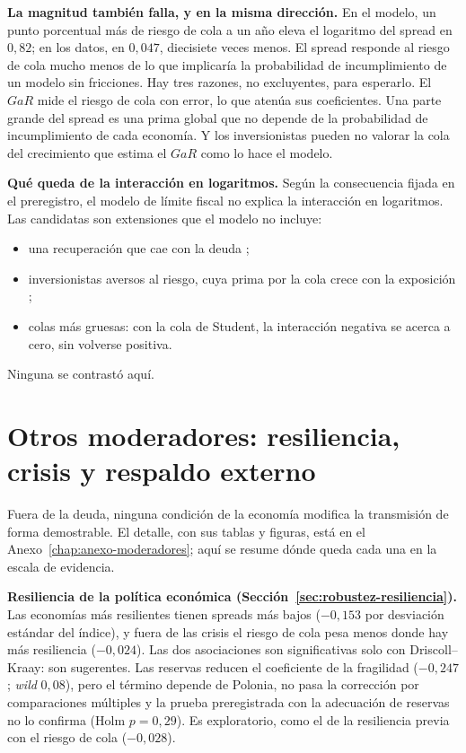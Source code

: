 \textbf{La magnitud también falla, y en la misma dirección.} En el modelo, un punto porcentual más de riesgo de cola a un año eleva el logaritmo del spread en $0{,}82$; en los datos, en $0{,}047$, diecisiete veces menos. El spread responde al riesgo de cola mucho menos de lo que implicaría la probabilidad de incumplimiento de un modelo sin fricciones. Hay tres razones, no excluyentes, para esperarlo. El $GaR$ mide el riesgo de cola con error, lo que atenúa sus coeficientes. Una parte grande del spread es una prima global que no depende de la probabilidad de incumplimiento de cada economía. Y los inversionistas pueden no valorar la cola del crecimiento que estima el $GaR$ como lo hace el modelo.

\textbf{Qué queda de la interacción en logaritmos.} Según la consecuencia fijada en el preregistro, el modelo de límite fiscal no explica la interacción en logaritmos. Las candidatas son extensiones que el modelo no incluye:
\begin{itemize}
    \item una recuperación que cae con la deuda \citep{Yue2010};
    \item inversionistas aversos al riesgo, cuya prima por la cola crece con la exposición \citep{Lizarazo2013};
    \item colas más gruesas: con la cola de Student, la interacción negativa se acerca a cero, sin volverse positiva.
\end{itemize}
Ninguna se contrastó aquí.

\section{Otros moderadores: resiliencia, crisis y respaldo externo}
\label{sec:moderadores-resumen}

Fuera de la deuda, ninguna condición de la economía modifica la transmisión de forma demostrable. El detalle, con sus tablas y figuras, está en el Anexo~\ref{chap:anexo-moderadores}; aquí se resume dónde queda cada una en la escala de evidencia.

\textbf{Resiliencia de la política económica (Sección~\ref{sec:robustez-resiliencia}).} Las economías más resilientes tienen spreads más bajos ($-0{,}153$ por desviación estándar del índice), y fuera de las crisis el riesgo de cola pesa menos donde hay más resiliencia ($-0{,}024$). Las dos asociaciones son significativas solo con Driscoll--Kraay: son sugerentes. Las reservas reducen el coeficiente de la fragilidad ($-0{,}247$; \textit{wild} $0{,}08$), pero el término depende de Polonia, no pasa la corrección por comparaciones múltiples y la prueba preregistrada con la adecuación de reservas no lo confirma (Holm $p=0{,}29$). Es exploratorio, como el de la resiliencia previa con el riesgo de cola ($-0{,}028$).

